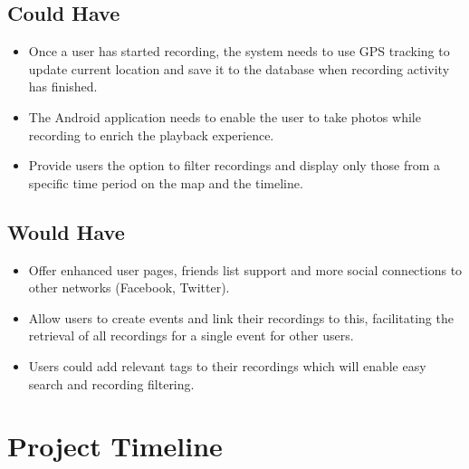 \documentclass{l3proj}
\begin{document}
\subsection{Could Have}
	\begin{itemize}
	\item{  Once a user has started recording, the system needs to use GPS tracking to update current location and save it to the database when recording activity has finished.}
	\item{  The Android application needs to enable the user to take photos while recording to enrich the playback experience.}
	\item{  Provide users the option to filter recordings and display only those from a specific time period on the map and the timeline.}
	\end{itemize}

\subsection{Would Have}
	\begin{itemize}
	\item{  Offer enhanced user pages, friends list support and more social connections to other networks (Facebook, Twitter).}
	\item{  Allow users to create events and link their recordings to this, facilitating the retrieval of all recordings for a single event for other users.}
	\item{  Users could add relevant tags to their recordings which will enable easy search and recording filtering.}
	\end{itemize}

\section{Project Timeline}



\end{document}
